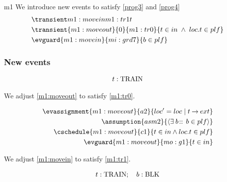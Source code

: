 \documentclass[12pt]{amsart}
\begin{document}
\begin{machine}{m1}
We introduce new events to satisfy \eqref{prog3} and \eqref{prog4}
\begin{align*}
& \transientB{m1:movein}{0}{m1:tr1}
	{ t \in in \1\land loc.t = ent }{ \index{t}{t} }
\\ & \transient{m1:moveout}{0}{m1:tr0}
	{ t \in in \1\land loc.t \in plf }
\\ & \evguard{m1:movein}{mi:grd7}
	{ b \in plf }
\end{align*}
\subsubsection{New events} 


\begin{align*}
\indices{m1:moveout}{	t : \Train}
\end{align*}

We adjust \ref{m1:moveout} to satisfy \ref{m1:tr0}.


\begin{align*}
\evassignment{m1:moveout}{a2}{ loc' = loc \1 | t \tfun ext }
\\ \assumption{asm2}
	{ \qexists{b}{}{b \in plf} }
\\ \cschedule{m1:moveout}{c1}{ t \in in \land loc.t \in plf }
\\ \evguard{m1:moveout}{mo:g1}{ t \in in }
\end{align*}

We adjust \ref{m1:movein} to satisfy \ref{m1:tr1}.


\begin{align*}
\indices{m1:movein}{	t : \Train} ; \quad
\param{m1:movein}{ b : \Blk }
\end{align*}


\end{machine}
\end{document}

